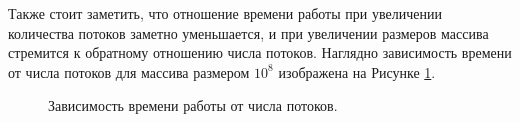 Также стоит заметить, что отношение времени работы при увеличении количества потоков заметно уменьшается, и при увеличении размеров массива стремится к обратному отношению числа потоков.
Наглядно зависимость времени от числа потоков для массива размером $10^8$ изображена на Рисунке \ref{pic3}.
\begin{figure}[h!]
\begin{minipage}[h]{0.5\linewidth}
\end{minipage}
\hspace{10pt}
\begin{minipage}[h]{0.5\linewidth}
\end{minipage} 
\caption{Зависимость времени работы от числа потоков.} \label{pic3}
\end{figure}

